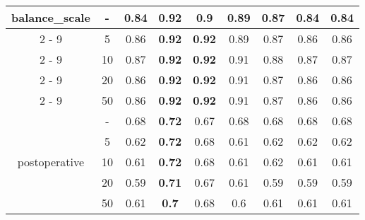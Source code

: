 \documentclass{article}%
\begin{document}
\begin{tabular}{c|c|ccccccc}
\hline%
\multirow{5}{*}{balance\_scale}&{-}&0.84&\textbf{0.92}&0.9&0.89&0.87&0.84&0.84\\%
\cline{2%
-%
9}%
&5&0.86&\textbf{0.92}&\textbf{0.92}&0.89&0.87&0.86&0.86\\%
\cline{2%
-%
9}%
&10&0.87&\textbf{0.92}&\textbf{0.92}&0.91&0.88&0.87&0.87\\%
\cline{2%
-%
9}%
&20&0.86&\textbf{0.92}&\textbf{0.92}&0.91&0.87&0.86&0.86\\%
\cline{2%
-%
9}%
&50&0.86&\textbf{0.92}&\textbf{0.92}&0.91&0.87&0.86&0.86\\%
\hline%
\multirow{5}{*}{postoperative}&{-}&0.68&\textbf{0.72}&0.67&0.68&0.68&0.68&0.68\\%
\cline{2%
-%
9}%
&5&0.62&\textbf{0.72}&0.68&0.61&0.62&0.62&0.62\\%
\cline{2%
-%
9}%
&10&0.61&\textbf{0.72}&0.68&0.61&0.62&0.61&0.61\\%
\cline{2%
-%
9}%
&20&0.59&\textbf{0.71}&0.67&0.61&0.59&0.59&0.59\\%
\cline{2%
-%
9}%
&50&0.61&\textbf{0.7}&0.68&0.6&0.61&0.61&0.61\\%
\hline%
\end{tabular}

%
\end{document}
